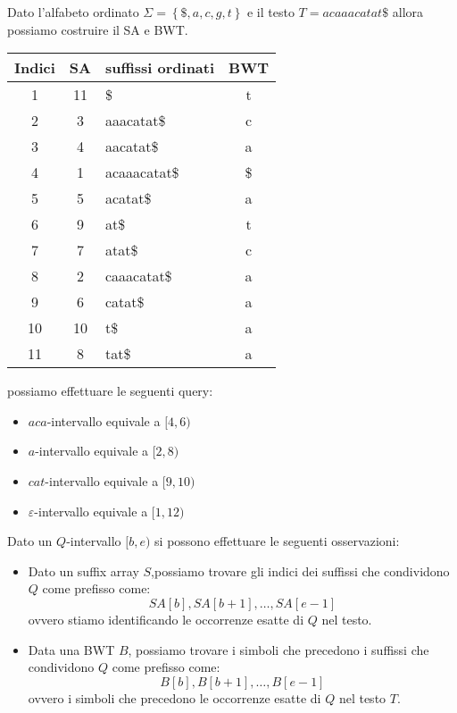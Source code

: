 \begin{esempio}
    Dato l'alfabeto ordinato $\Sigma=\left\{\$, a, c, g, t\right\}$ e il testo
    $T=acaaacatat\$$ allora possiamo costruire il SA e BWT.

    \begin{table}[!ht]
        \centering
        \begin{tabular}{|c|c|l|c|}
            \hline
            Indici & SA & suffissi ordinati & BWT \\ \hline
            1      & 11 & \$                & t   \\ \hline
            2      & 3  & aaacatat\$        & c   \\ \hline
            3      & 4  & aacatat\$         & a   \\ \hline
            4      & 1  & acaaacatat\$      & \$  \\ \hline
            5      & 5  & acatat\$          & a   \\ \hline
            6      & 9  & at\$              & t   \\ \hline
            7      & 7  & atat\$            & c   \\ \hline
            8      & 2  & caaacatat\$       & a   \\ \hline
            9      & 6  & catat\$           & a   \\ \hline
            10     & 10 & t\$               & a   \\ \hline
            11     & 8  & tat\$             & a   \\ \hline
        \end{tabular}
    \end{table}

    possiamo effettuare le seguenti query:
    \begin{itemize}
        \item $aca$-intervallo equivale a $[4,6)$
        \item $a$-intervallo equivale a $[2,8)$
        \item $cat$-intervallo equivale a $[9,10)$
        \item $\varepsilon$-intervallo equivale a $[1,12)$
    \end{itemize}
\end{esempio}
Dato un $Q$-intervallo $[b, e)$ si possono effettuare le seguenti osservazioni:
\begin{itemize}
    \item Dato un suffix array $S$,possiamo trovare gli indici dei suffissi
          che condividono $Q$ come prefisso come:
          \begin{equation}
              SA[b], SA[b + 1], \dots, SA[e - 1]
          \end{equation}
          ovvero stiamo identificando le occorrenze esatte di $Q$ nel testo.
    \item Data una BWT $B$, possiamo trovare i simboli che precedono i suffissi
          che condividono $Q$ come prefisso come:
          \begin{equation}
              B[b], B[b + 1], \dots, B[e - 1]
          \end{equation}
          ovvero i simboli che precedono le occorrenze esatte di $Q$ nel testo $T$.
\end{itemize}
